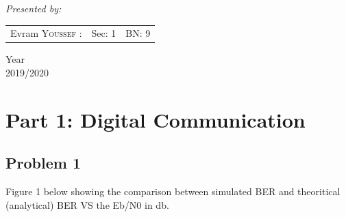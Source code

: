 \documentclass[a4paper,12pt]{report}
\begin{document}
\begin{titlepage}
\begin{center}
    \vspace{2cm}
    
    
    {\huge \textit{Presented by: }}\\[0.5cm]
    
    \color{black}
    \centering
    \begin{tabular}{lll}
    \large Evram \textsc{Youssef} : & \large Sec: 1 & \large BN: 9 \\[0.1cm]
    
    \end{tabular}
    
    \vfill
    
    {\LARGE {Year}\\ 2019/2020}
    \end{center}
    \end{titlepage}

    \newpage

    \tableofcontents
    \listoffigures
    \listoftables
    \newpage


    \section{Part 1: Digital Communication}
        
    \subsection{Problem 1}
        Figure 1 below showing the comparison between simulated BER and theoritical (analytical) BER
        VS the Eb/N0 in db.
\end{document}
